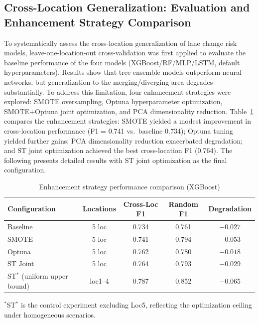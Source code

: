 \documentclass[preprint,review,12pt,a4paper]{elsarticle}
\begin{document}
\subsection{Cross-Location Generalization: Evaluation and Enhancement Strategy Comparison}

To systematically assess the cross-location generalization of lane change risk models, leave-one-location-out cross-validation was first applied to evaluate the baseline performance of the four models (XGBoost/RF/MLP/LSTM, default hyperparameters). Results show that tree ensemble models outperform neural networks, but generalization to the merging/diverging area degrades substantially. To address this limitation, four enhancement strategies were explored: SMOTE oversampling, Optuna hyperparameter optimization, SMOTE+Optuna joint optimization, and PCA dimensionality reduction. Table~\ref{tab:enhance_summary} compares the enhancement strategies: SMOTE yielded a modest improvement in cross-location performance (F1 = 0.741 vs.\ baseline 0.734); Optuna tuning yielded further gains; PCA dimensionality reduction exacerbated degradation; and ST joint optimization achieved the best cross-location F1 (0.764). The following presents detailed results with ST joint optimization as the final configuration.

\begin{table}[H]
\centering
\caption{Enhancement strategy performance comparison (XGBoost)}
\label{tab:enhance_summary}
\small
\begin{tabular}{lcccc}
\toprule
Configuration & Locations & Cross-Loc F1 & Random F1 & Degradation \\
\midrule
Baseline & 5 loc & 0.734 & 0.761 & $-0.027$ \\
SMOTE & 5 loc & 0.741 & 0.794 & $-0.053$ \\
Optuna & 5 loc & 0.762 & 0.780 & $-0.018$ \\
ST Joint & 5 loc & 0.764 & 0.793 & $-0.029$ \\
ST$^*$ (uniform upper bound) & loc1--4 & 0.787 & 0.852 & $-0.065$ \\
\bottomrule
\end{tabular}
\end{table}
\noindent$^*$ST$^*$ is the control experiment excluding Loc5, reflecting the optimization ceiling under homogeneous scenarios.
\end{document}
